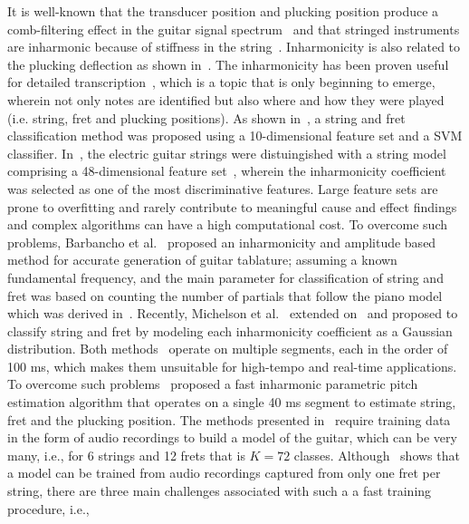 \documentclass{article}
\begin{document}
\begin{sloppy}
It is well-known that the transducer position and plucking position produce a comb-filtering effect in the guitar signal spectrum~\cite{fletcher:physics_of_musical_instruments} and that stringed instruments are inharmonic because of stiffness in the string~\cite{fletcher:principles_of_vibration_and_sound}. Inharmonicity is also related to the plucking deflection as shown in~\cite{donkin:acoustics,rayleigh:sound,coltShank,rossing:science_of_string_instruments}. The inharmonicity has been proven useful for detailed transcription~\cite{barbancho:inharmonicity_tablature}, which is a topic that is only beginning to emerge, wherein not only notes are identified but also where and how they were played (i.e. string, fret and plucking positions). As shown in~\cite{dittmar:realtime_string_detection}, a string and fret classification method was proposed using a 10-dimensional feature set and a SVM classifier. In~\cite{abesser:automatic_string_detection_ml}, the electric guitar strings were distuingished with a string model comprising a 48-dimensional feature set~\cite{abesser:automatic_string_detection_ml}, wherein the inharmonicity coefficient was selected as one of the most discriminative features. Large feature sets are prone to overfitting and rarely contribute to meaningful cause and effect findings and complex algorithms can have a high computational cost. 
To overcome such problems, Barbancho et al.~\cite{barbancho:inharmonicity_tablature} proposed an inharmonicity and amplitude based method for accurate generation of guitar tablature; assuming a known fundamental frequency, and the main parameter for classification of string and fret was based on counting the number of partials that follow the piano model which was derived in~\cite{fletcher:piano_model}. Recently, Michelson et al.~\cite{michelson2018_aes} extended on~\cite{barbancho:inharmonicity_tablature} and proposed to classify string and fret by modeling each inharmonicity coefficient as a Gaussian distribution. Both methods~\cite{barbancho:inharmonicity_tablature,michelson2018_aes} operate on multiple segments, each in the order of 100 ms, which makes them unsuitable for high-tempo and real-time applications. To overcome such problems~\cite{hjerrild::icassp19} proposed a fast inharmonic parametric pitch estimation algorithm that operates on a single 40 ms segment to estimate string, fret and the plucking position. The methods presented in~\cite{barbancho:inharmonicity_tablature,michelson2018_aes,hjerrild::icassp19} require training data in the form of audio recordings to build a model of the guitar, which can be very many, i.e., for 6 strings and 12 frets that is $K=72$  classes. Although~\cite{hjerrild::icassp19,barbancho:inharmonicity_tablature} shows that a model can be trained from audio recordings captured from only one fret per string, there are three main challenges associated with such a a fast training procedure, i.e.,

\end{sloppy}
\end{document}
